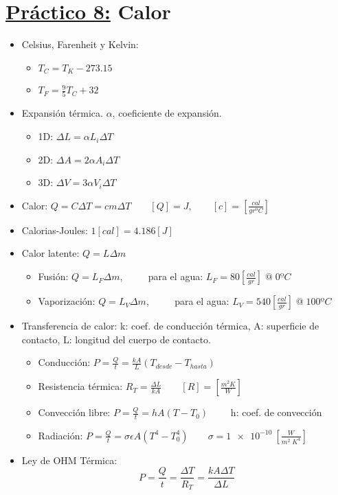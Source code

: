 \documentclass[12pt,a4paper]{article}
\begin{document}
	\section*{\underline{Práctico 8:} Calor}
		\begin{itemize}
			\item Celsius, Farenheit y Kelvin:
				\begin{multicols}{2}
					\begin{itemize}
						\item $T_{C} = T_{K} - 273.15$
						\item $T_{F} = \frac{9}{5} T_{C} + 32$
					\end{itemize}
				\end{multicols}
			\item Expansión térmica. $\alpha$, coeficiente de expansión.
				\begin{multicols}{3}
					\begin{itemize}
						\item 1D: $ \Delta L = \alpha L_{i} \Delta T$
						\item 2D: $ \Delta A = 2\alpha A_{i} \Delta T$
						\item 3D: $ \Delta V = 3\alpha V_{i} \Delta T$
					\end{itemize}
				\end{multicols}
			\item Calor: $Q = C \Delta T = cm \Delta T \qquad [Q] = J, \qquad [c] = [\frac{cal}{grºC}]$
			\item Calorias-Joules: $1 [cal] = 4.186 [J]$
			\item Calor latente: $Q = L \Delta m$
				\begin{itemize}
					\item Fusión: $Q = L_{F} \Delta m$, $\qquad$ para el agua: $L_{F} = 80 [\frac{cal}{gr}] \; @ \; 0ºC$
					\item Vaporización: $Q = L_{V} \Delta m$, $\qquad$ para el agua: $L_{V} = 540 [\frac{cal}{gr}] \; @ \; 100ºC$
				\end{itemize}
			\item Transferencia de calor: k: coef. de conducción térmica, A: superficie de contacto, L: longitud del cuerpo de
				contacto.
				\begin{itemize}
					\item Conducción: $P = \frac{Q}{t} = \frac{kA}{L} (T_{desde} - T_{hasta})$
					\item Resistencia térmica: $R_{T} = \frac{\Delta L}{kA} \qquad [R] = [\frac{m^{2}K}{W}]$
					\item Convección libre: $P = \frac{Q}{t} = h A (T - T_{0}) \qquad$ h: coef. de convección
					\item Radiación: $P = \frac{Q}{t} = \sigma \epsilon A (T^{4} - T_{0}^{4}) \qquad \sigma = \SI{1e-10}{}
						[\frac{W}{m^{2} \; K^{4}}]$
				\end{itemize}
			\item Ley de OHM Térmica:
				\[
					P = \frac{Q}{t} = \frac{\Delta T}{R_{T}} = \frac{kA \Delta T}{\Delta L}
				\]
		\end{itemize}
\end{document}
